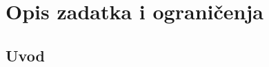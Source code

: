 \documentclass[11pt,a4paper]{report}
\begin{document}
\chapter{Opis zadatka i ograničenja}\label{OpisIOgranicenja}
\section{Uvod}

\newpage
\nocite{*}


\newpage
\appendix
\end{document}

